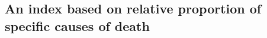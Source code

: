 \documentclass[11pt]{article}
\begin{document}
 

\subsection{An index based on relative proportion of specific causes of death}
\label{subsec:causes-deaths}
\end{document}
